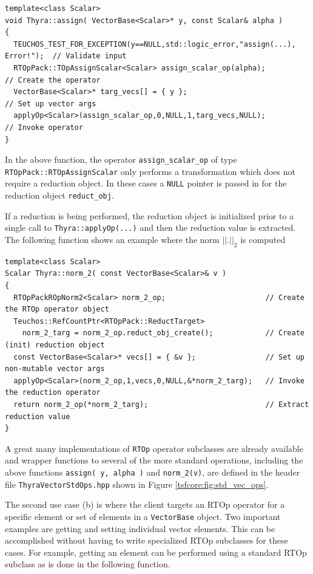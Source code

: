 \documentclass[pdf,ps2pdf,11pt]{SANDreport}
\begin{document}
{\scriptsize\begin{verbatim}
template<class Scalar>
void Thyra::assign( VectorBase<Scalar>* y, const Scalar& alpha )
{
  TEUCHOS_TEST_FOR_EXCEPTION(y==NULL,std::logic_error,"assign(...), Error!");  // Validate input
  RTOpPack::TOpAssignScalar<Scalar> assign_scalar_op(alpha);           // Create the operator
  VectorBase<Scalar>* targ_vecs[] = { y };                             // Set up vector args
  applyOp<Scalar>(assign_scalar_op,0,NULL,1,targ_vecs,NULL);           // Invoke operator
}
\end{verbatim}}

{}\noindent{}In the above function, the operator
{}\texttt{assign\_scalar\_op} of type
{}\texttt{RTOpPack::RTOpAssignScalar} only performs a transformation
which does not require a reduction object.  In these cases a
{}\texttt{NULL} pointer is passed in for the reduction object
{}\texttt{reduct\_obj}.

If a reduction is being performed, the reduction object is initialized
prior to a single call to {}\texttt{Thyra::applyOp(\-...)} and then
the reduction value is extracted.  The following function shows an
example where the norm $||.||_2$ is computed

{\scriptsize\begin{verbatim}
template<class Scalar>
Scalar Thyra::norm_2( const VectorBase<Scalar>& v )
{
  RTOpPackROpNorm2<Scalar> norm_2_op;                       // Create the RTOp operator object
  Teuchos::RefCountPtr<RTOpPack::ReductTarget>
    norm_2_targ = norm_2_op.reduct_obj_create();            // Create (init) reduction object
  const VectorBase<Scalar>* vecs[] = { &v };                // Set up non-mutable vector args
  applyOp<Scalar>(norm_2_op,1,vecs,0,NULL,&*norm_2_targ);   // Invoke the reduction operator
  return norm_2_op(*norm_2_targ);                           // Extract reduction value
}
\end{verbatim}}

{}\noindent{}A great many implementations of {}\texttt{RTOp} operator
subclasses are already available and wrapper functions to several of
the more standard operations, including the above functions
{}\texttt{assign( y, alpha )} and {}\texttt{norm\_2(v)}, are defined
in the header file {}\texttt{Thyra\-Vector\-Std\-Ops.hpp} shown in
Figure {}\ref{tsfcore:fig:std_vec_ops}.

The second use case (b) is where the client targets an RTOp operator
for a specific element or set of elements in a {}\texttt{Vector\-Base}
object.  Two important examples are getting and setting individual
vector elements.  This can be accomplished without having to write
specialized RTOp subclasses for these cases.  For example, getting an
element can be performed using a standard RTOp subclass as is done in
the following function.
\end{document}
